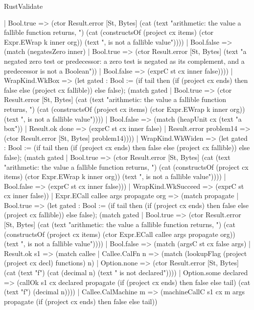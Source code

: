 \begin{lexlean}{RustValidate}
\begin{semanticmodule}
{        | Bool.true => (ctor Result.error [St, Bytes] (cat (text "arithmetic: the value a fallible function returns, ") (cat (constructsOf (project cx items) (ctor Expr.EWrap k inner org)) (text ", is not a fallible value"))))
        | Bool.false => (match (negatesZero inner)
          | Bool.true => (ctor Result.error [St, Bytes] (text "a negated zero test or predecessor: a zero test is negated as its complement, and a predecessor is not a Boolean"))
          | Bool.false => (exprC st cx inner false))))
      | WrapKind.WkBox => (let gated : Bool := (if tail then (if (project cx ends) then false else (project cx fallible)) else false); (match gated
        | Bool.true => (ctor Result.error [St, Bytes] (cat (text "arithmetic: the value a fallible function returns, ") (cat (constructsOf (project cx items) (ctor Expr.EWrap k inner org)) (text ", is not a fallible value"))))
        | Bool.false => (match (heapUnit cx (text "a box"))
          | Result.ok done => (exprC st cx inner false)
          | Result.error problem14 => (ctor Result.error [St, Bytes] problem14))))
      | WrapKind.WkWiden => (let gated : Bool := (if tail then (if (project cx ends) then false else (project cx fallible)) else false); (match gated
        | Bool.true => (ctor Result.error [St, Bytes] (cat (text "arithmetic: the value a fallible function returns, ") (cat (constructsOf (project cx items) (ctor Expr.EWrap k inner org)) (text ", is not a fallible value"))))
        | Bool.false => (exprC st cx inner false)))
      | WrapKind.WkSucceed => (exprC st cx inner false))
    | Expr.ECall callee args propagate org => (match propagate
      | Bool.true => (let gated : Bool := (if tail then (if (project cx ends) then false else (project cx fallible)) else false); (match gated
        | Bool.true => (ctor Result.error [St, Bytes] (cat (text "arithmetic: the value a fallible function returns, ") (cat (constructsOf (project cx items) (ctor Expr.ECall callee args propagate org)) (text ", is not a fallible value"))))
        | Bool.false => (match (argsC st cx false args)
          | Result.ok s1 => (match callee
            | Callee.CalFn n => (match (lookupFlag (project (project cx decl) functions) n)
              | Option.none => (ctor Result.error [St, Bytes] (cat (text "f") (cat (decimal n) (text " is not declared"))))
              | Option.some declared => (callOk s1 cx declared propagate (if (project cx ends) then false else tail) (cat (text "f") (decimal n))))
            | Callee.CalMachine m => (machineCallC s1 cx m args propagate (if (project cx ends) then false else tail))
}
\end{semanticmodule}
\end{lexlean}
